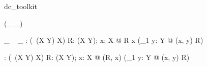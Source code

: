 
\begin{zsection}
   \SECTION dc\_toolkit
\end{zsection}

\begin{zed}
   \relation (\_ \appliesTo \_)
\end{zed}

\begin{gendef}[X, Y]
   \_ \appliesTo~ \_ : \power(\power~(X \cross Y) \cross X)
\where
   \forall R: \power(X \cross Y); x: X @ R \appliesTo x \iff (\exists_1 y: Y @ (x, y) \in R)
\end{gendef} 

\begin{gendef}[X, Y]
   \appliesToNofix : \power(\power~(X \cross Y) \cross X)
\where
   \forall R: \power(X \cross Y); x: X @ (R, x) \in \appliesToNofix \iff (\exists_1 y: Y @ (x, y) \in R)
\end{gendef} 
